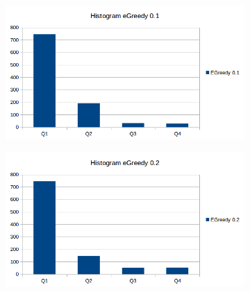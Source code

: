 \documentclass[a4paper, 11pt]{article}
\begin{document}
\begin{figure}[H]
\begin{subfigure}{.5\textwidth}
  \centering
  \includegraphics[width=1\linewidth]{ex1_histogram_egreedy01}
\end{subfigure}%
\begin{subfigure}{.5\textwidth}
  \centering
  \includegraphics[width=1\linewidth]{ex1_histogram_egreedy02}
\end{subfigure}%


\end{figure}
\end{document}
